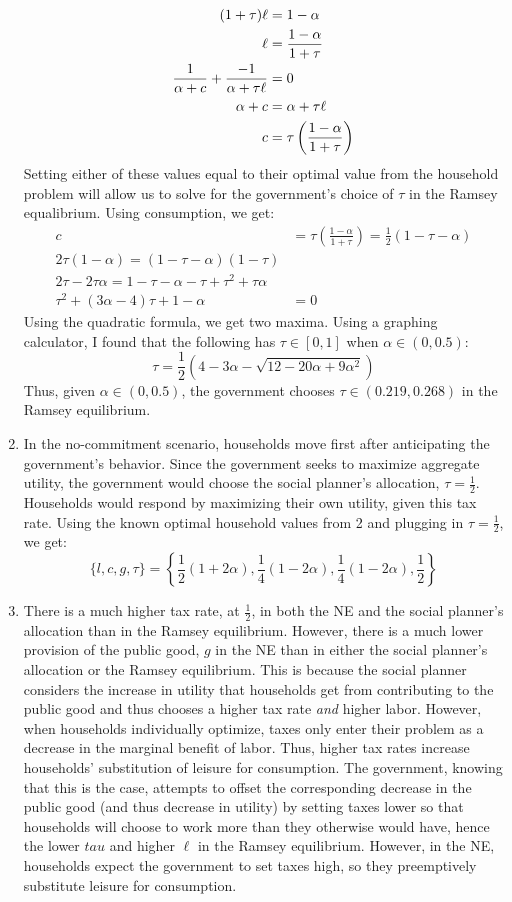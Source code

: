 \documentclass{article}
\begin{document}
\begin{enumerate}
\begin{align*}
			(1+\tau)\ell &= 1-\alpha \\
			\ell &= \frac{1-\alpha}{1+\tau} \medskip \\
			\frac{1}{\alpha+c} + \frac{-1}{\alpha+\tau\ell} &= 0 \\
			\alpha+c &= \alpha+\tau\ell  \\
			c &= \tau\left(\frac{1-\alpha}{1+\tau}\right)
		\end{align*}
		Setting either of these values equal to their optimal value from the household problem will allow us to solve for the government's choice of $\tau$ in the Ramsey equalibrium. Using consumption, we get:
		\begin{align*}
			c &= \tau\left(\frac{1-\alpha}{1+\tau}\right) = \frac{1}{2}(1-\tau-\alpha)	\\
			2\tau(1-\alpha) = (1-\tau-\alpha)(1-\tau)					\\
			2\tau-2\tau\alpha = 1-\tau-\alpha-\tau+\tau^2+\tau\alpha	\\
			\tau^2 + (3\alpha-4)\tau+1-\alpha &= 0
		\end{align*}
		Using the quadratic formula, we get two maxima. Using a graphing calculator, I found that the following has $\tau\in[0,1]$ when $\alpha\in(0,0.5)$:
		\[
			\tau = \frac{1}{2}\left(4 - 3\alpha - \sqrt{12 - 20\alpha + 9 \alpha^2}\right)
		\]
		Thus, given $\alpha\in(0,0.5)$, the government chooses $\tau\in(0.219,0.268)$ in the Ramsey equilibrium.
		
	\item In the no-commitment scenario, households move first after anticipating the government's behavior. Since the government seeks to maximize aggregate utility, the government would choose the social planner's allocation, $\tau=\frac{1}{2}$. Households would respond by maximizing their own utility, given this tax rate. Using the known optimal household values from 2 and plugging in $\tau=\frac{1}{2}$, we get:
	\[
		{\{l,c,g,\tau\}=\left\{\frac{1}{2}(1+2\alpha),\frac{1}{4}(1-2\alpha),\frac{1}{4}(1-2\alpha),\frac{1}{2} \right\}}
	\]
	
	\item There is a much higher tax rate, at $\frac{1}{2}$, in both the NE and the social planner's allocation than in the Ramsey equilibrium. However, there is a much lower provision of the public good, $g$ in the NE than in either the social planner's allocation or the Ramsey equilibrium. This is because the social planner considers the increase in utility that households get from contributing to the public good and thus chooses a higher tax rate \textit{and} higher labor. However, when households individually optimize, taxes only enter their problem as a decrease in the marginal benefit of labor. Thus, higher tax rates increase households' substitution of leisure for consumption. The government, knowing that this is the case, attempts to offset the corresponding decrease in the public good (and thus decrease in utility) by setting taxes lower so that households will choose to work more than they otherwise would have, hence the lower $tau$ and higher $\ell$ in the Ramsey equilibrium. However, in the NE, households expect the government to set taxes high, so they preemptively substitute leisure for consumption.
	

\end{enumerate}
\end{document}
